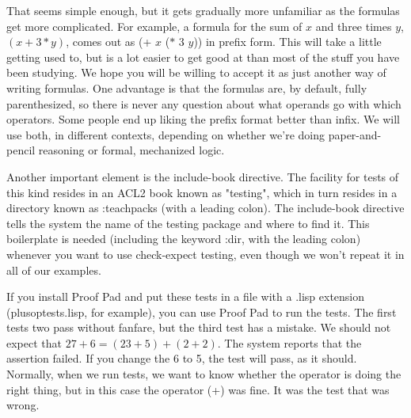 That seems simple enough, but it gets gradually more unfamiliar
as the formulas get more complicated.
For example, a formula for the sum of $x$ and three times $y$, $(x + 3*y)$,
comes out as \textsf{(+ $x$ ($*$ 3 $y$))} in prefix form.
This will take a little getting used to,
but is a lot easier to get good at than
most of the stuff you have been studying.
We hope you will be willing to accept it as just another way of writing formulas.
One advantage is that the formulas are, by default, fully parenthesized,
so there is never any question about what operands go with which operators.
Some people end up liking the prefix format better than infix.
We will use both, in different contexts, depending on whether
we're doing paper-and-pencil reasoning or formal, mechanized logic.

Another important element is the
\textsf{include-book} 
directive.
The facility for tests of this kind resides in an ACL2 book
known as "\textsf{testing}", which in turn resides in a directory known
as
\textsf{:teachpacks} (with a leading colon).
The \textsf{include-book} directive tells the system
the name of the testing package and where to find it.
This boilerplate is needed (including the keyword \textsf{:dir}, with the leading colon)
whenever you want to use \textsf{check-expect} testing,
even though we won't repeat it in all of our examples.

If you install Proof Pad and put these tests in a file
with a .lisp extension (plusoptests.lisp, for example),
you can use Proof Pad to run the tests.
The first tests two pass without fanfare,
but the third test has a mistake.
We should not expect that $27 + 6 = (23 + 5) + (2 + 2)$.
The system reports that the assertion failed.
If you change the 6 to 5, the test will pass, as it should.
Normally, when we run tests, we want to know whether the
operator is doing the right thing,
but in this case the operator (\textsf{+}) was fine.
It was the test that was wrong.

